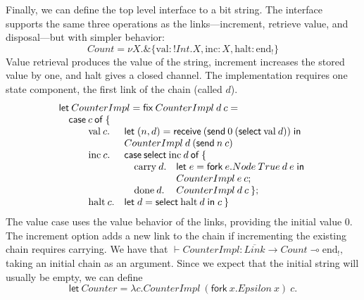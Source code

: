 \documentclass[orivec,envcountsame]{llncs}
\newcommand{\with}{\mathbin\binampersand}
\newcommand{\gvdual}[1]{\overline{#1}}
\newcommand{\gvout}[2]{{!#1.#2}}
\newcommand{\lto}{\ensuremath{\multimap}}
\newcommand{\uto}{\ensuremath{\rightarrow}}
\newcommand{\outterm}{\mathrm{end}_!}
\newcommand{\gvtyp}[3]{#1 \vdash #2 : #3}
\newcommand{\mkwd}[1]{\mathsf{#1}}
\newcommand{\link}[2]{#1 \leftrightarrow #2}
\newcommand{\cut}[4]{\mkwd{new}\:#1 \: (#3 \mid #4)}
\newcommand{\rec}[1]{\mkwd{rec}\:#1}
\newcommand{\clabel}[1]{\mathrm{#1}}
\newcommand{\sel}[2]{#1[\clabel{#2}]}
\newcommand{\gvsend}[2]{\mkwd{send}\:#1\:#2}
\newcommand{\gvreceive}[1]{\mkwd{receive}\:#1}
\newcommand{\gvlet}[3]{\mkwd{let}\;#1 = #2\;\mkwd{in}\;#3}
\newcommand{\gvselect}[2]{\mkwd{select}\:#1\:#2}
\newcommand{\gvfork}[2]{\mkwd{fork}\:#1.#2}
\newcommand{\lrkwd}{\mkwd{fix}}
\begin{document}
Finally, we can define the top level interface to a bit string.  The interface supports the same
three operations as the links---increment, retrieve value, and disposal---but with simpler behavior:
\[
  Count = \nu X. \with \{ \clabel{val}: \gvout{Int}{X}, \clabel{inc}: X, \clabel{halt}: \outterm \}
\]
Value retrieval produces the value of the string, increment increases the stored value by one, and
halt gives a closed channel.  The implementation requires one state component, the first link of the
chain (called $d$).
\[\begin{array}{llll}
\mcl{4}{\mkwd{let}\:CounterImpl = \lrkwd\:CounterImpl\:d\:c =} \\
\mcl{4}{\quad \mkwd{case}\:c\:\mkwd{of}\:\{} \\
\quad \quad & \clabel{val}\:c. & \mcl{2}{\gvlet{(n,d)}{\gvreceive{(\gvsend{0}{(\gvselect{\clabel{val}}{d})})}}} \\
& & \mcl{2}{CounterImpl\:d\:(\gvsend{n}{c})} \\
& \clabel{inc}\:c. & \mcl{2}{\mkwd{case}\:\gvselect{\clabel{inc}}{d}\:\mkwd{of}\:\{} \\
& & \quad \clabel{carry}\:d. & \gvlet{e}{\gvfork{e}{Node\:True\:d\:e}}{} \\
& & & CounterImpl\:e\:c; \\
& & \quad \clabel{done}\:d. & CounterImpl\:d\:c\:\}; \\
& \clabel{halt}\:c. & \mcl{2}{\gvlet{d}{\gvselect{\clabel{halt}}{d}}{c}\:\}}
\end{array}\]
The value case uses the value behavior of the links, providing the initial value 0.  The increment
option adds a new link to the chain if incrementing the existing chain requires carrying.  We have
that $\gvtyp{}{CounterImpl}{\gvdual{Link} \uto Count \lto \outterm},$ taking an initial chain as an argument.
Since we expect that the initial string will usually be empty, we can define
\[
  \mkwd{let}\:Counter = \lambda c.CounterImpl\:(\gvfork{x}{Epsilon\:x})\:c.
\]
%
%
\end{document}
